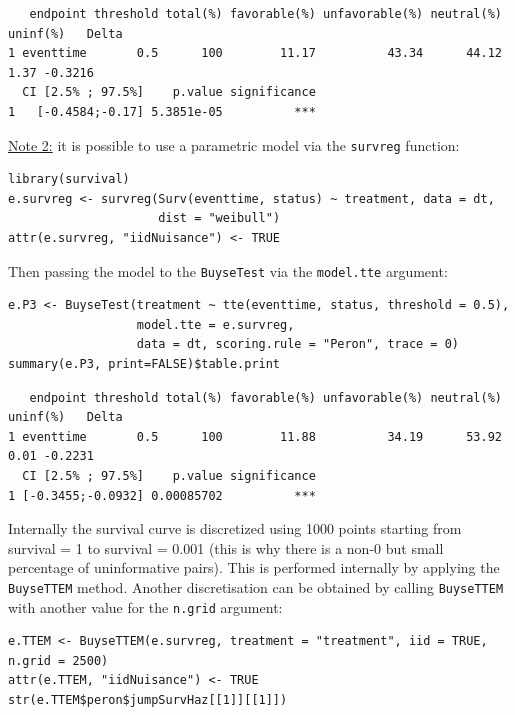 \documentclass[12pt]{article}
\begin{document}
\begin{verbatim}
   endpoint threshold total(%) favorable(%) unfavorable(%) neutral(%) uninf(%)   Delta
1 eventtime       0.5      100        11.17          43.34      44.12     1.37 -0.3216
  CI [2.5% ; 97.5%]    p.value significance
1   [-0.4584;-0.17] 5.3851e-05          ***
\end{verbatim}


\bigskip

\uline{Note 2:} it is possible to use a parametric model via the \texttt{survreg} function:
\lstset{language=r,label= ,caption= ,captionpos=b,numbers=none}
\begin{lstlisting}
library(survival)
e.survreg <- survreg(Surv(eventtime, status) ~ treatment, data = dt, 
                     dist = "weibull")
attr(e.survreg, "iidNuisance") <- TRUE
\end{lstlisting}

Then passing the model to the \texttt{BuyseTest} via the \texttt{model.tte} argument:
\lstset{language=r,label= ,caption= ,captionpos=b,numbers=none}
\begin{lstlisting}
e.P3 <- BuyseTest(treatment ~ tte(eventtime, status, threshold = 0.5),
                  model.tte = e.survreg,
                  data = dt, scoring.rule = "Peron", trace = 0)
summary(e.P3, print=FALSE)$table.print
\end{lstlisting}
\begin{verbatim}
   endpoint threshold total(%) favorable(%) unfavorable(%) neutral(%) uninf(%)   Delta
1 eventtime       0.5      100        11.88          34.19      53.92     0.01 -0.2231
  CI [2.5% ; 97.5%]    p.value significance
1 [-0.3455;-0.0932] 0.00085702          ***
\end{verbatim}


Internally the survival curve is discretized using 1000 points
starting from survival = 1 to survival = 0.001 (this is why there is a
non-0 but small percentage of uninformative pairs). This is performed
internally by applying the \texttt{BuyseTTEM} method. Another discretisation
can be obtained by calling \texttt{BuyseTTEM} with another value for the \texttt{n.grid} argument:
\lstset{language=r,label= ,caption= ,captionpos=b,numbers=none}
\begin{lstlisting}
e.TTEM <- BuyseTTEM(e.survreg, treatment = "treatment", iid = TRUE, n.grid = 2500)
attr(e.TTEM, "iidNuisance") <- TRUE
str(e.TTEM$peron$jumpSurvHaz[[1]][[1]])
\end{lstlisting}
\end{document}
